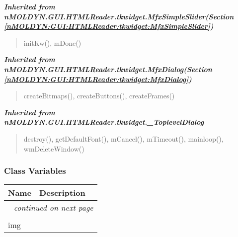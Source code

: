 \large{\textbf{\textit{Inherited from nMOLDYN.GUI.HTMLReader.tkwidget.MfxSimpleSlider\textit{(Section \ref{nMOLDYN:GUI:HTMLReader:tkwidget:MfxSimpleSlider})}}}}

\begin{quote}
initKw(), mDone()
\end{quote}

\large{\textbf{\textit{Inherited from nMOLDYN.GUI.HTMLReader.tkwidget.MfxDialog\textit{(Section \ref{nMOLDYN:GUI:HTMLReader:tkwidget:MfxDialog})}}}}

\begin{quote}
createBitmaps(), createButtons(), createFrames()
\end{quote}

\large{\textbf{\textit{Inherited from nMOLDYN.GUI.HTMLReader.tkwidget.\_ToplevelDialog}}}

\begin{quote}
destroy(), getDefaultFont(), mCancel(), mTimeout(), mainloop(), wmDeleteWindow()
\end{quote}


  \subsubsection{Class Variables}

    \vspace{-1cm}
\hspace{\varindent}\begin{longtable}{|p{\varnamewidth}|p{\vardescrwidth}|l}
\cline{1-2}
\cline{1-2} \centering \textbf{Name} & \centering \textbf{Description}& \\
\cline{1-2}
\endhead\cline{1-2}\multicolumn{3}{r}{\small\textit{continued on next page}}\\\endfoot\cline{1-2}
\endlastfoot\multicolumn{2}{|l|}{\textit{Inherited from nMOLDYN.GUI.HTMLReader.tkwidget.\_ToplevelDialog}}\\
\multicolumn{2}{|p{\varwidth}|}{\raggedright img}\\
\cline{1-2}
\end{longtable}



